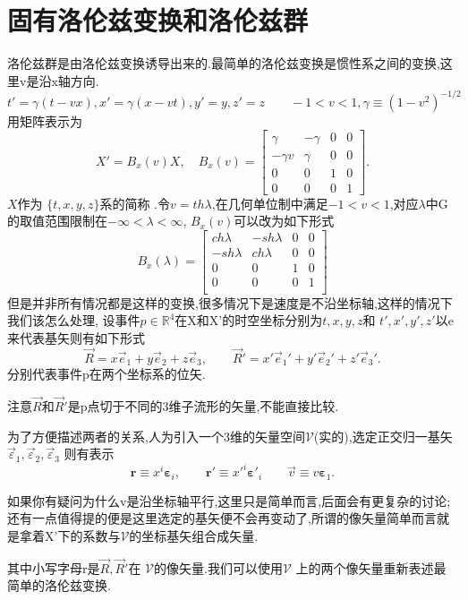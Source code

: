 \documentclass[../main.tex]{subfiles}
\begin{document}
\section{固有洛伦兹变换和洛伦兹群}
洛伦兹群是由洛伦兹变换诱导出来的.最简单的洛伦兹变换是惯性系之间的变换,这里v是沿x轴方向.
$$t'=\gamma (t -vx),x'=\gamma(x-vt),y' = y,z' = z\qquad -1<v<1, \gamma \equiv (1-v^2)^{-1/2}$$
用矩阵表示为\[
	X' = B_x(v)X,\quad B_x(v) = \begin{bmatrix}
		\gamma    & -\gamma & 0 & 0 \\
		-\gamma v & \gamma  & 0 & 0 \\
		0         & 0       & 1 & 0 \\
		0         & 0       & 0 & 1\end{bmatrix}
	.\]
$X$作为 $\{t,x,y,z\}$系的简称 .令$v = th\lambda$,在几何单位制中满足$-1<v<1$,对应$\lambda$中G的取值范围限制在$-\infty <\lambda<\infty$, $B_x(v)$可以改为如下形式
\[
	B_x(\lambda) = \begin{bmatrix}
		ch\lambda  & -sh\lambda & 0 & 0 \\
		-sh\lambda & ch\lambda  & 0 & 0 \\
		0          & 0          & 1 & 0 \\
		0          & 0          & 0 & 1 \\
	\end{bmatrix}
\]
但是并非所有情况都是这样的变换,很多情况下是速度是不沿坐标轴,这样的情况下我们该怎么处理,
设事件$p \in \mathbb{R}^4$在X和X'的时空坐标分别为$t,x,y,z$和 $t',x',y',z'$以e来代表基矢则有如下形式
\[
	\vec{R} = x \vec{e}_1 + y \vec{e}_2 + z \vec{e}_3 ,\qquad
	\vec{R}{}' = x' \vec{e}_1{}' + y' \vec{e}_2{}' + z' \vec{e}_3{}'
	.\]
分别代表事件p在两个坐标系的位矢.
\begin{note}
	注意$\vec{R}$和$\vec{R}'$是p点切于不同的3维子流形的矢量,不能直接比较.
\end{note}
为了方便描述两者的关系,人为引入一个3维的矢量空间$\mathscr{V}$(实的),选定正交归一基矢$\vec{\varepsilon}_1,\vec{\varepsilon}_2,\vec{\varepsilon}_3$
则有表示\[
	\bm{r} \equiv x^i \bm{\varepsilon}_i,\qquad \bm{r}' \equiv x'^i \bm{\varepsilon}'_i\qquad \vec{v} \equiv v \bm{\varepsilon}_1
	.\]
\begin{note}
	如果你有疑问为什么v是沿坐标轴平行,这里只是简单而言,后面会有更复杂的讨论;还有一点值得提的便是这里选定的基矢便不会再变动了,所谓的像矢量简单而言就是拿着X'下的系数与$\mathscr{V}$的坐标基矢组合成矢量.
\end{note}
其中小写字母r是$\vec{R},\vec{R} '$在 $\mathscr{V}$的像矢量.我们可以使用$\mathscr{V}$ 上的两个像矢量重新表述最简单的洛伦兹变换.
\end{document}
